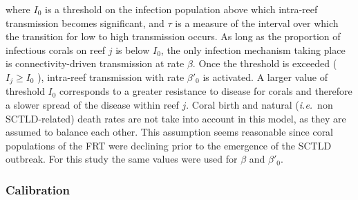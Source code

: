 \documentclass[utf8]{frontiersSCNS}
\newcommand{\ie}{{\it i.e.}\ }
\begin{document}
where $I_0$ is a threshold on the infection population above which intra-reef transmission becomes significant, and $\tau$ is a measure of the interval over which the transition for low to high transmission occurs. As long as the proportion of infectious corals on reef $j$ is below $I_0$, the only infection mechanism taking place is connectivity-driven transmission at rate $\beta$. Once the threshold is exceeded ( $I_j \geq I_0$ ), intra-reef transmission with rate $\beta'_0$ is activated. A larger value of threshold $I_0$ corresponds to a greater resistance to disease for corals and therefore a slower spread of the disease within reef $j$. Coral birth and natural (\ie non SCTLD-related) death rates are not take into account in this model, as they are assumed to balance each other. This assumption seems reasonable since coral populations of the FRT were declining prior to the emergence of the SCTLD outbreak. For this study the same values were used for $\beta$ and $\beta'_0$.

\subsubsection{Calibration}
\end{document}

